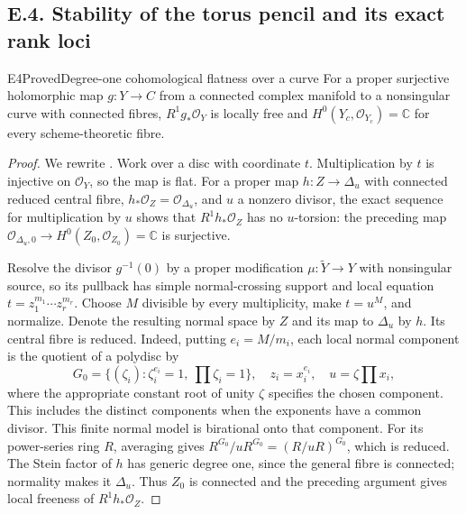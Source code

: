 \subsection{E.4. Stability of the torus pencil and its exact rank loci}


\begin{statement}{E4}{Proved}{Degree-one cohomological flatness over a curve}
For a proper surjective holomorphic map $g:Y\to C$ from a connected complex
manifold to a nonsingular curve with connected fibres,
$R^1g_*\mathcal O_Y$ is locally free and
$H^0(Y_c,\mathcal O_{Y_c})=\mathbb C$ for every scheme-theoretic fibre.
\end{statement}
\begin{proof}
We rewrite \cite[Theorem labelled \texttt{raynaud}]{Viaclovsky2026Combs}.
Work over a disc with coordinate
$t$. Multiplication by $t$ is injective on $\mathcal O_Y$, so the map
is flat. For a proper map $h:Z\to\Delta_u$ with connected reduced
central fibre, $h_*\mathcal O_Z=\mathcal O_{\Delta_u}$, and $u$ a
nonzero divisor, the exact sequence for multiplication by $u$ shows
that $R^1h_*\mathcal O_Z$ has no $u$-torsion: the preceding map
$\mathcal O_{\Delta_u,0}\to H^0(Z_0,\mathcal O_{Z_0})=\mathbb C$
is surjective.

Resolve the divisor $g^{-1}(0)$ by a proper modification
$\mu:\widetilde Y\to Y$ with nonsingular source, so its pullback has
simple normal-crossing support and local equation
$t=z_1^{m_1}\cdots z_r^{m_r}$. Choose $M$ divisible by every
multiplicity, make $t=u^M$, and normalize. Denote the resulting
normal space by $Z$ and its map to $\Delta_u$ by $h$. Its central
fibre is reduced. Indeed, putting $e_i=M/m_i$, each local normal
component is the quotient of a polydisc by
\[
 G_0=\{(\zeta_i):\zeta_i^{e_i}=1,\ \prod\zeta_i=1\},
 \quad z_i=x_i^{e_i},\quad u=\zeta\prod x_i,
\]
where the appropriate constant root of unity $\zeta$ specifies the
chosen component. This includes the distinct components when the
exponents have a common divisor. This finite normal model is
birational onto that component.
For its power-series ring $R$, averaging gives
$R^{G_0}/uR^{G_0}=(R/uR)^{G_0}$, which is reduced. The Stein factor
of $h$ has generic degree one, since the general fibre is connected;
normality makes it $\Delta_u$. Thus $Z_0$ is connected and the
preceding argument gives local freeness of $R^1h_*\mathcal O_Z$.


\end{proof}
